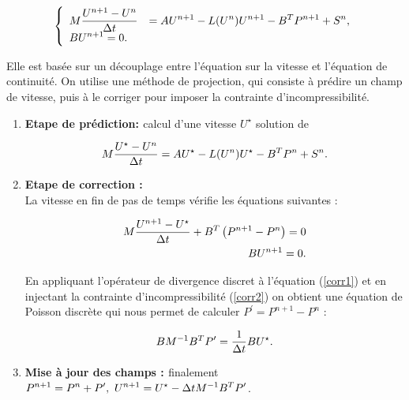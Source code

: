 \begin{equation}
\label{schema-implicit}
  \left\{
\begin{array}{ll}
\ds{M \frac{U^{n+1} - U^{n}}{\Delta t}} & =\ds{ A U^{n+1} - L(U^n)U^{n+1} - B^T P^{n+1} + S^n},\\
\ds{B U^{n+1} = 0}.
\end{array}
\right.
\end{equation}

 Elle est bas\'ee sur un d\'ecouplage entre l'\'equation sur la vitesse et l'\'equation de continuit\'e. On utilise une m\'ethode de projection, qui consiste \`a pr\'edire un champ de vitesse, puis \`a le corriger pour imposer la contrainte d'incompressibilit\'e.
 
 \begin{enumerate}
 
 \item {\bf{Etape de pr\'ediction: }} calcul d'une vitesse $U^{\star}$ solution de 
 
 \begin{equation}
 \label{prediction}
 \ds{
 M\frac {U^{\star}-U^n}{\Delta t}=AU^{\star} -L(U^n)U^{\star} - B^T P^n +S^n.
 }
 \end{equation}


\item {\bf{Etape de correction : } }\\

La vitesse en fin de pas de temps v\'erifie les \'equations suivantes : 

\begin{eqnarray}
\label{corr1}
\ds{ M\frac {U^{n+1}-U^{\star}}{\Delta t}+B^T \left( P^{n+1}-P^n\right) = 0}\\
%
\label{corr2}
BU^{n+1}=0.
\end{eqnarray}

En appliquant l'op\'erateur de divergence discret \`a l'\'equation (\ref{corr1}) et en injectant la contrainte d'incompressibilit\'e (\ref{corr2}) on obtient une \'equation de Poisson discr\`ete qui nous permet de calculer $ P^{\prime} = 
P^{n+1}-P^n$ : 

\begin{equation}
\ds{
BM^{-1}B^T P^{\prime} = \frac{1}{\Delta t}BU^{\star}.
}
\end{equation}

\item {\bf{Mise \`a jour des champs : }} finalement $\ds{ P^{n+1}=P^n +P^{\prime} , \ U^{n+1}= U^{\star} - \Delta t M^{-1} B^T P^{\prime}}$. 
\end{enumerate}

